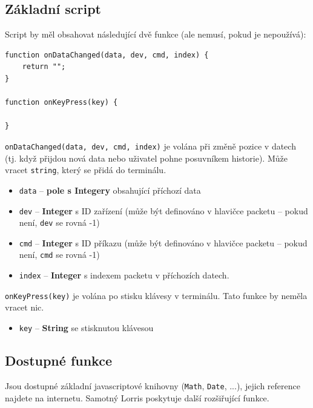 \documentclass[12pt, a4paper, oneside]{article}
\begin{document}
\newpage
\subsection*{Základní script}
Script by měl obsahovat následující dvě funkce (ale nemusí, pokud je nepoužívá):

\noindent\begin{minipage}{\textwidth}
\begin{lstlisting}[caption=Základní script]
function onDataChanged(data, dev, cmd, index) {
    return "";
}

function onKeyPress(key) {

}
\end{lstlisting}
\end{minipage}

{\color{blue}\verb/onDataChanged(data, dev, cmd, index)/} je volána při změně pozice v datech (tj. když přijdou nová data nebo uživatel pohne posuvníkem historie). Může vracet \verb/string/, který se přidá do terminálu.

\begin{itemize}
    \item \verb/data/ -- {\bf pole s Integery} obsahující příchozí data
    \item \verb/dev/ -- {\bf Integer} s ID zařízení (může být definováno v hlavičce packetu -- pokud není, \verb/dev/ se rovná -1)
    \item \verb/cmd/ -- {\bf Integer} s ID příkazu (může být definováno v hlavičce packetu -- pokud není, \verb/cmd/ se rovná -1)
    \item \verb/index/ -- {\bf Integer} s indexem packetu v příchozích datech.
\end{itemize}

{\color{blue}\verb/onKeyPress(key)/} je volána po stisku klávesy v terminálu. Tato funkce by neměla vracet nic.
\begin{itemize}
    \item \verb/key/ -- {\bf String} se stisknutou klávesou
\end{itemize}

\subsection*{Dostupné funkce}
Jsou dostupné základní javascriptové knihovny (\verb/Math/, \verb/Date/, ...), jejich reference najdete na internetu. Samotný Lorris poskytuje další rozšiřující funkce. 
\end{document}
